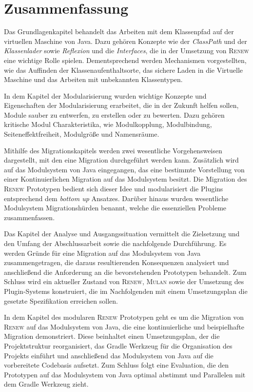 \section{Zusammenfassung}

Das Grundlagenkapitel behandelt das Arbeiten mit dem Klassenpfad auf der virtuellen Maschine von Java. Dazu gehören Konzepte wie der \textit{ClassPath} und der \textit{Klassenlader} sowie \textit{Reflexion} und die \textit{Interfaces}, die in der Umsetzung von \textsc{Renew} eine wichtige Rolle spielen. Dementsprechend werden Mechanismen vorgestellten, wie das Auffinden der Klassenaufenthaltsorte, das sichere Laden in die Virtuelle Maschine und das Arbeiten mit unbekannten Klassentypen.\bigbreak

In dem Kapitel der Modularisierung wurden wichtige Konzepte und Eigenschaften der Modularisierung erarbeitet, die in der Zukunft helfen sollen, Module sauber zu entwerfen, zu erstellen oder zu bewerten. Dazu gehören kritische Modul Charakteristika, wie Modulkopplung, Modulbindung, Seiteneffektfreiheit, Modulgröße und Namensräume. \bigbreak

Mithilfe des Migrationskapitels werden zwei wesentliche Vorgehensweisen dargestellt, mit den eine Migration durchgeführt werden kann. Zusätzlich wird auf das Modulsystem von Java eingegangen, das eine bestimmte Vorstellung von einer Kontinuierlichen Migration auf das Modulsystem besitzt. \newline
Die Migration des \textsc{Renew} Prototypen bedient sich dieser Idee und modularisiert die Plugins entsprechend dem \textit{bottom up} Ansatzes. Darüber hinaus wurden wesentliche Modulsystem Migrationshürden benannt, welche die essenziellen Probleme zusammenfassen. \bigbreak

Das Kapitel der Analyse und Ausgangssituation vermittelt die Zielsetzung und den Umfang der Abschlussarbeit sowie die nachfolgende Durchführung. Es werden Gründe für eine Migration auf das Modulsystem von Java zusammengetragen, die daraus resultierenden Konsequenzen analysiert und anschließend die Anforderung an die bevorstehenden Prototypen behandelt. Zum Schluss wird ein aktueller Zustand von \textsc{Renew}, \textsc{Mulan} sowie der Umsetzung des Plugin-Systems konstruiert, die im Nachfolgenden mit einem Umsetzungsplan die gesetzte Spezifikation erreichen sollen.\bigbreak

In dem Kapitel des modularen \textsc{Renew} Prototypen geht es um die Migration von \textsc{Renew} auf das Modulsystem von Java, die eine kontinuierliche und beispielhafte Migration demonstriert. Diese beinhaltet einen Umsetzungsplan, der die Projektstruktur reorganisiert, das Gradle Werkzeug für die Organisation des Projekts einführt und anschließend das Modulsystem von Java auf die vorbereitete Codebasis aufsetzt. Zum Schluss folgt eine Evaluation, die den Prototypen auf das Modulsystem von Java optimal abstimmt und Parallelen mit dem Gradle Werkzeug zieht.\bigbreak

